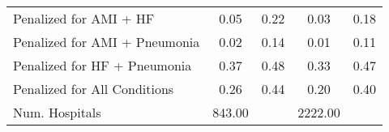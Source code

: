 \begin{table}[ht!]
\begin{tabular}[t]{lcccc}
\hspace{1em}Penalized for AMI + HF & 0.05 & 0.22 & 0.03 & 0.18\\
\hspace{1em}Penalized for AMI + Pneumonia & 0.02 & 0.14 & 0.01 & 0.11\\
\hspace{1em}Penalized for HF + Pneumonia & 0.37 & 0.48 & 0.33 & 0.47\\
\hspace{1em}Penalized for All Conditions & 0.26 & 0.44 & 0.20 & 0.40\\
Num. Hospitals & 843.00 &  & 2222.00 & \\
\bottomrule
\end{tabular}
\end{table}
